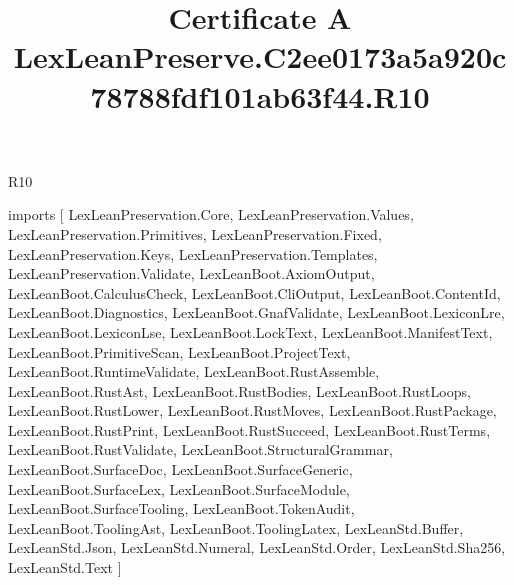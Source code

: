 \begin{lexlean}{R10}
\title{Certificate A LexLeanPreserve.C2ee0173a5a920c78788fdf101ab63f44.R10}
\begin{coremodule}
imports [
  LexLeanPreservation.Core,
  LexLeanPreservation.Values,
  LexLeanPreservation.Primitives,
  LexLeanPreservation.Fixed,
  LexLeanPreservation.Keys,
  LexLeanPreservation.Templates,
  LexLeanPreservation.Validate,
  LexLeanBoot.AxiomOutput,
  LexLeanBoot.CalculusCheck,
  LexLeanBoot.CliOutput,
  LexLeanBoot.ContentId,
  LexLeanBoot.Diagnostics,
  LexLeanBoot.GnafValidate,
  LexLeanBoot.LexiconLre,
  LexLeanBoot.LexiconLse,
  LexLeanBoot.LockText,
  LexLeanBoot.ManifestText,
  LexLeanBoot.PrimitiveScan,
  LexLeanBoot.ProjectText,
  LexLeanBoot.RuntimeValidate,
  LexLeanBoot.RustAssemble,
  LexLeanBoot.RustAst,
  LexLeanBoot.RustBodies,
  LexLeanBoot.RustLoops,
  LexLeanBoot.RustLower,
  LexLeanBoot.RustMoves,
  LexLeanBoot.RustPackage,
  LexLeanBoot.RustPrint,
  LexLeanBoot.RustSucceed,
  LexLeanBoot.RustTerms,
  LexLeanBoot.RustValidate,
  LexLeanBoot.StructuralGrammar,
  LexLeanBoot.SurfaceDoc,
  LexLeanBoot.SurfaceGeneric,
  LexLeanBoot.SurfaceLex,
  LexLeanBoot.SurfaceModule,
  LexLeanBoot.SurfaceTooling,
  LexLeanBoot.TokenAudit,
  LexLeanBoot.ToolingAst,
  LexLeanBoot.ToolingLatex,
  LexLeanStd.Buffer,
  LexLeanStd.Json,
  LexLeanStd.Numeral,
  LexLeanStd.Order,
  LexLeanStd.Sha256,
  LexLeanStd.Text
]


\end{coremodule}
\end{lexlean}
